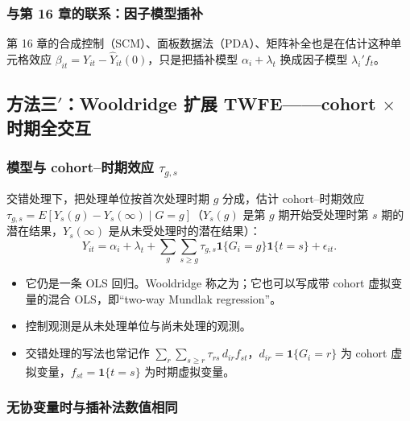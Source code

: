 \subsubsection{与第 16 章的联系：因子模型插补}

第 16 章的合成控制（SCM）、面板数据法（PDA）、矩阵补全也是在估计这种单元格效应 $\beta_{it}=Y_{it}-\hat Y_{it}(0)$，只是把插补模型 $\alpha_i+\lambda_t$ 换成因子模型 $\lambda_i'f_t$。

\subsection{方法三\texorpdfstring{$'$}{'}：Wooldridge 扩展 TWFE——cohort \texorpdfstring{$\times$}{x} 时期全交互}\label{sec:U17b-etwfe}

\subsubsection{模型与 cohort--时期效应 \texorpdfstring{$\tau_{g,s}$}{tau\_gs}}

交错处理下，把处理单位按首次处理时期 $g$ 分成，估计 cohort--时期效应 $\tau_{g,s}=E[Y_s(g)-Y_s(\infty)\mid G=g]$（$Y_s(g)$ 是第 $g$ 期开始受处理时第 $s$ 期的潜在结果，$Y_s(\infty)$ 是从未受处理时的潜在结果）：
\[
Y_{it}=\alpha_i+\lambda_t+\sum_g\sum_{s\ge g}\tau_{g,s}\mathbf{1}\{G_i=g\}\mathbf{1}\{t=s\}+\epsilon_{it}.
\]
\begin{itemize}
  \item 它仍是一条 OLS 回归。Wooldridge 称之为；它也可以写成带 cohort 虚拟变量的混合 OLS，即“two-way Mundlak regression”。
  \item 控制观测是从未处理单位与尚未处理的观测。
  \item 交错处理的写法也常记作 $\sum_r\sum_{s\ge r}\tau_{rs}\,d_{ir}f_{st}$，$d_{ir}=\mathbf{1}\{G_i=r\}$ 为 cohort 虚拟变量，$f_{st}=\mathbf{1}\{t=s\}$ 为时期虚拟变量。
\end{itemize}

\subsubsection{无协变量时与插补法数值相同}

